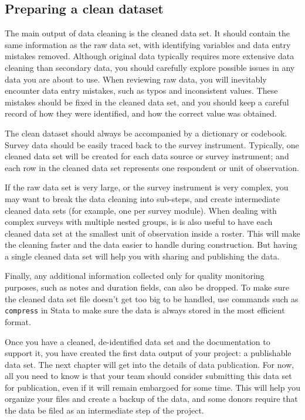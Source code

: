 \subsection{Preparing a clean dataset}
The main output of data cleaning is the cleaned data set.
It should contain the same information as the raw data set,
with identifying variables and data entry mistakes removed.
Although original data typically requires more extensive data cleaning than secondary data,
you should carefully explore possible issues in any data you are about to use.
When reviewing raw data, you will inevitably encounter data entry mistakes,
such as typos and inconsistent values.
These mistakes should be fixed in the cleaned data set,
and you should keep a careful record of how they were identified,
and how the correct value was obtained.

The clean dataset should always be accompanied by a dictionary or codebook.
Survey data should be easily traced back to the survey instrument.
Typically, one cleaned data set will be created for each data source
or survey instrument; and each row in the cleaned data set represents one
respondent or unit of observation.\cite{tidy-data}

If the raw data set is very large, or the survey instrument is very complex,
you may want to break the data cleaning into sub-steps,
and create intermediate cleaned data sets
(for example, one per survey module).
When dealing with complex surveys with multiple nested groups,
is is also useful to have each cleaned data set at the smallest unit of observation inside a roster.
This will make the cleaning faster and the data easier to handle during construction.
But having a single cleaned data set will help you with sharing and publishing the data.

Finally, any additional information collected only for quality monitoring purposes,
such as notes and duration fields, can also be dropped.
To make sure the cleaned data set file doesn't get too big to be handled,
use commands such as \texttt{compress} in Stata to make sure the data
is always stored in the most efficient format.

Once you have a cleaned, de-identified data set and the documentation to support it,
you have created the first data output of your project: a publishable data set.
The next chapter will get into the details of data publication.
For now, all you need to know is that your team should consider submitting this data set for publication,
even if it will remain embargoed for some time.
This will help you organize your files and create a backup of the data,
and some donors require that the data be filed as an intermediate step of the project.


